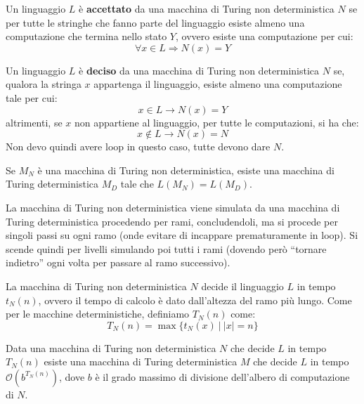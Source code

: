 \begin{definizione}
    Un linguaggio $L$ è \textbf{accettato} da una macchina di Turing non 
    deterministica $N$ se per tutte le stringhe che fanno parte del linguaggio 
    esiste almeno una computazione che termina nello stato $Y$, ovvero esiste una 
    computazione per cui: 
    \begin{equation}
        \forall x \in L \Rightarrow N(x) = Y
    \end{equation}
\end{definizione}
\begin{definizione}
    Un linguaggio $L$ è \textbf{deciso} da una macchina di Turing non deterministica 
    $N$ se, qualora la stringa $x$ appartenga il linguaggio, esiste almeno una 
    computazione tale per cui:
    \begin{equation}
        x \in L \to N(x) = Y
    \end{equation}
    altrimenti, se $x$ non appartiene al linguaggio, per tutte le computazioni, si ha che: 
    \begin{equation}
        x \not\in L \to N(x) = N
    \end{equation}
    Non devo quindi avere loop in questo caso, tutte devono dare $N$.
\end{definizione}
\begin{teorema}
Se $M_N$ è una macchina di Turing non deterministica, esiste una macchina di 
Turing deterministica $M_D$ tale che $L(M_N) = L(M_D)$.
\end{teorema}
\begin{dimostrazione}
    La macchina di Turing non deterministica viene simulata da una macchina di 
    Turing deterministica procedendo per rami, concludendoli, ma si procede per 
    singoli passi su ogni ramo (onde evitare di incappare prematuramente in loop). 
    Si scende quindi per livelli simulando poi tutti i rami (dovendo però “tornare
     indietro” ogni volta per passare al ramo successivo).
\end{dimostrazione}

La macchina di Turing non deterministica $N$ decide il linguaggio $L$ in tempo
 $t_N(n)$, ovvero il tempo di calcolo è dato dall'altezza del ramo più lungo. 
 Come per le macchine deterministiche, definiamo $T_N(n)$ come:
\begin{equation}
    T_N(n) = \max \{t_N(x) \ | \ |x| = n\}
\end{equation}

Data una macchina di Turing non deterministica $N$ che decide $L$ in tempo $T_N(n)$ 
esiste una macchina di Turing deterministica $M$ che decide $L$ in tempo
 $\mathcal{O}(b^{T_N(n)})$, dove $b$ è il grado massimo di divisione dell'albero di computazione di $N$.

